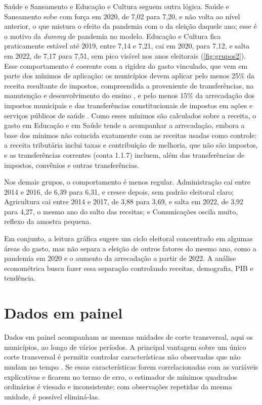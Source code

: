 Saúde e Saneamento e Educação e Cultura seguem outra lógica. Saúde e Saneamento sobe com força em 2020, de 7,02 para 7,20, e não volta ao nível anterior, o que mistura o efeito da pandemia com o da eleição daquele ano; esse é o motivo da \textit{dummy} de pandemia no modelo. Educação e Cultura fica praticamente estável até 2019, entre 7,14 e 7,21, cai em 2020, para 7,12, e salta em 2022, de 7,17 para 7,51, sem pico visível nos anos eleitorais (\autoref{fig:grupos2}). Esse comportamento é coerente com a rigidez do gasto vinculado, que vem em parte dos mínimos de aplicação: os municípios devem aplicar pelo menos 25\% da receita resultante de impostos, compreendida a proveniente de transferências, na manutenção e desenvolvimento do ensino \parencite[art.~212]{cf1988}, e pelo menos 15\% da arrecadação dos impostos municipais e das transferências constitucionais de impostos em ações e serviços públicos de saúde \parencite[art.~7º]{lc141_2012}. Como esses mínimos são calculados sobre a receita, o gasto em Educação e em Saúde tende a acompanhar a arrecadação, embora a base dos mínimos não coincida exatamente com as receitas usadas como controle: a receita tributária inclui taxas e contribuição de melhoria, que não são impostos, e as transferências correntes (conta 1.1.7) incluem, além das transferências de impostos, convênios e outras transferências.

Nos demais grupos, o comportamento é menos regular. Administração cai entre 2014 e 2016, de 6,39 para 6,31, e cresce depois, sem padrão eleitoral claro; Agricultura cai entre 2014 e 2017, de 3,88 para 3,69, e salta em 2022, de 3,92 para 4,27, o mesmo ano do salto das receitas; e Comunicações oscila muito, reflexo da amostra pequena.

Em conjunto, a leitura gráfica sugere um ciclo eleitoral concentrado em algumas áreas do gasto, mas não separa a eleição de outros fatores do mesmo ano, como a pandemia em 2020 e o aumento da arrecadação a partir de 2022. A análise econométrica busca fazer essa separação controlando receitas, demografia, PIB e tendência.

\section{Dados em painel}\label{sec:painel}

Dados em painel acompanham as mesmas unidades de corte transversal, aqui os municípios, ao longo de vários períodos. A principal vantagem sobre um único corte transversal é permitir controlar características não observadas que não mudam no tempo \parencite[p.~247--249]{wooldridge2002}. Se essas características forem correlacionadas com as variáveis explicativas e ficarem no termo de erro, o estimador de mínimos quadrados ordinários é viesado e inconsistente; com observações repetidas da mesma unidade, é possível eliminá-las.


